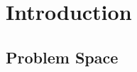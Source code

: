 \documentclass[journal]{IEEEtran}
\begin{document}


%
\IEEEpeerreviewmaketitle



\section{Introduction}
% 
% 
% 
% 

\subsection{Problem Space}
\end{document}
